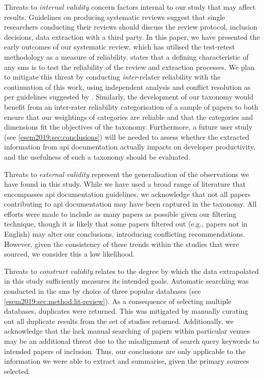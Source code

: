Threats to \textit{internal validity} concern factors internal to our study that may affect results. Guidelines on producing systematic reviews \citep{Kitchenham:2007dd} suggest that single researchers conducting their reviews should discuss the review protocol, inclusion decisions, data extraction with a third party. In this paper, we have presented the early outcomes of our systematic review, which has utilised the test-retest methodology as a measure of reliability. \citet{5416726} states that a defining characteristic of any \gls{sms} is to test the reliability of the review and extraction processes. We plan to mitigate this threat by conducting \textit{inter}-relater reliability with the continuation of this work, using independent analysis and conflict resolution as per guidelines suggested by \citet{Garousi:2017:EGE:3084226.3084238}. Similarly, the development of our taxonomy would benefit from an inter-rater reliability categorisation of a sample of papers to both ensure that our weightings of categories are reliable and that the categories and dimensions fit the objectives of the taxonomy. Furthermore, a future user study (see \cref{esem2019:sec:conclusions}) will be needed to assess whether the extracted information from \gls{api} documentation actually impacts on developer productivity, and the usefulness of such a taxonomy should be evaluated.


Threats to \textit{external validity} represent the generalisation of the observations we have found in this study. While we have used a broad range of literature that encompasses \gls{api} documentation guidelines, we acknowledge that not all papers contributing to \gls{api} documentation may have been captured in the taxonomy. All efforts were made to include as many papers as possible given our filtering technique, though it is likely that some papers filtered out (e.g., papers not in English) may alter our conclusions, introducing conflicting recommendations. However, given the consistency of these trends within the studies that were sourced, we consider this a low likelihood.

Threats to \textit{construct validity} relates to the degree by which the data extrapolated in this study sufficiently measures its intended goals. Automatic searching was conducted in the \gls{sms} by choice of three popular databases (see \cref{esem2019:sec:method:lit-review}). As a consequence of selecting multiple databases, duplicates were returned. This was mitigated by manually curating out all duplicate results from the set of studies returned. Additionally, we acknowledge that the lack manual searching of papers within particular venues may be an additional threat due to the misalignment of search query keywords to intended papers of inclusion. Thus, our conclusions are only applicable to the information we were able to extract and summarise, given the primary sources selected.

